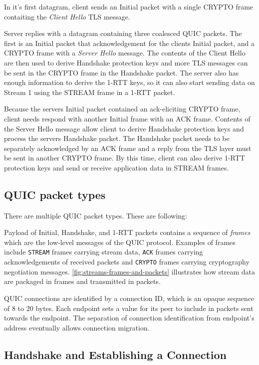 In it's first datagram, client sends an Initial packet with a single CRYPTO frame contaiting the
\textit{Client Hello} TLS message.

Server replies with a datagram containing three coalesced QUIC packets. The first is an Initial
packet that acknowledgement for the clients Initial packet, and a CRYPTO frame with a \textit{Server
  Hello} message. The contents of the Client Hello are then used to derive Handshake protection keys
and more TLS messages can be sent in the CRYPTO frame in the Handshake packet. The server also has
enough information to derive the 1-RTT keys, so it can also start sending data on Stream 1 using the
STREAM frame in a 1-RTT packet.

Because the servers Initial packet contained an ack-eliciting CRYPTO frame, client needs respond
with another Initial frame with an ACK frame. Contents of the Server Hello message allow client to
derive Handshake protection keys and process the servers Handshake packet. The Handshake packet
needs to be separately acknowledged by an ACK frame and a reply from the TLS layer must be sent in
another CRYPTO frame. By this time, client can also derive 1-RTT protection keys and send or receive
application data in STREAM frames.

\subsection{QUIC packet types}

There are multiple QUIC packet types. These are following:

Payload of Initial, Handshake, and 1-RTT packets contains a sequence of \textit{frames} which are
the low-level messages of the QUIC protocol. Examples of frames include \texttt{STREAM} frames
carrying stream data, \texttt{ACK} frames carrying acknowledgements of received packets and
\texttt{CRYPTO} frames carrying cryptography negotiation messages.
\autoref{fig:streams-frames-and-packets} illustrates how stream data are packaged in frames and
transmitted in packets.

QUIC connections are identified by a connection ID, which is an opaque sequence of 8 to 20 bytes.
Each endpoint sets a value for its peer to include in packets sent towards the endpoint. The
separation of connection identification from endpoint's address eventually allows connection
migration.

\subsection{Handshake and Establishing a Connection}

